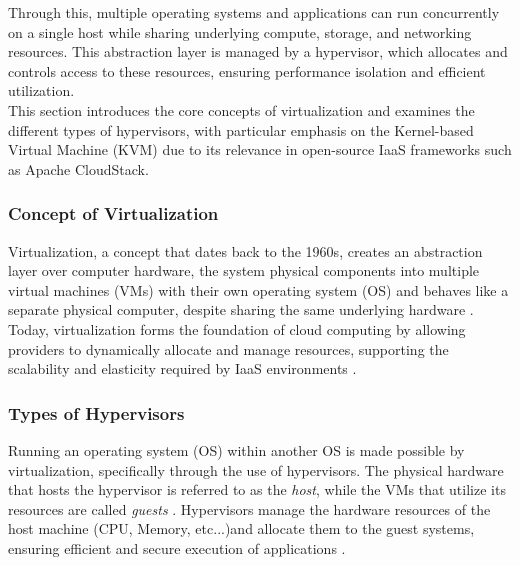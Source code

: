 \documentclass[sigplan]{acmart}
\begin{document}
        Through this, multiple operating systems and applications can run concurrently on a single host while sharing underlying compute, storage, and networking resources. \cite{IBMVirtualization, ratnanginirekComparativeStudyHypervisor2021}
        This abstraction layer is managed by a hypervisor, which allocates and controls access to these resources, ensuring performance isolation and efficient utilization.\\ 
        
        This section introduces the core concepts of virtualization and examines the different types of hypervisors, with particular emphasis on the Kernel-based Virtual Machine (KVM) due to its relevance in open-source IaaS frameworks such as Apache CloudStack.
        
        \subsubsection{Concept of Virtualization}
            Virtualization, a concept that dates back to the 1960s\cite{ratnanginirekComparativeStudyHypervisor2021, IBMVirtualization}, creates an abstraction layer over computer hardware, the system physical components into multiple virtual machines (VMs) with their own operating system (OS) and behaves like a separate physical computer, despite sharing the same underlying hardware \cite{IBMVirtualization}.\\

            Today, virtualization forms the foundation of cloud computing by allowing providers to dynamically allocate and manage resources, supporting the scalability and elasticity required by IaaS environments \cite{IBMVirtualization}.
        
        \subsubsection{Types of Hypervisors}
            Running an operating system (OS) within another OS is made possible by virtualization, specifically through the use of hypervisors. 
            The physical hardware that hosts the hypervisor is referred to as the \textit{host}, while the VMs that utilize its resources are called \textit{guests} \cite{RedhatKVM}. 
            Hypervisors manage the hardware resources of the host machine (CPU, Memory, etc...)and allocate them to the guest systems, ensuring efficient and secure execution of applications \cite{ratnanginirekComparativeStudyHypervisor2021}. \\
            
\end{document}

